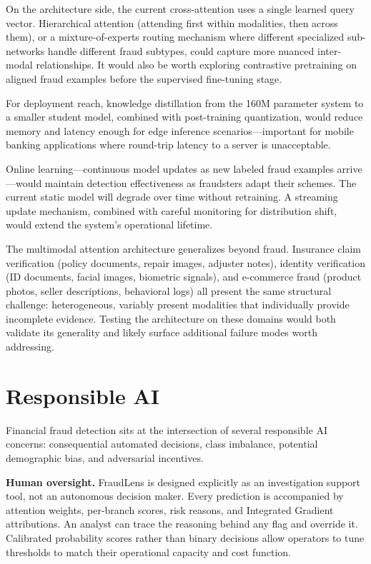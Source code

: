 \documentclass[10pt,conference,letterpaper]{IEEEtran}
\begin{document}
On the architecture side, the current cross-attention uses a single learned query vector.
Hierarchical attention (attending first within modalities, then across them), or a
mixture-of-experts routing mechanism where different specialized sub-networks handle
different fraud subtypes, could capture more nuanced inter-modal relationships. It would
also be worth exploring contrastive pretraining on aligned fraud examples before the
supervised fine-tuning stage.

For deployment reach, knowledge distillation from the 160M parameter system to a smaller
student model, combined with post-training quantization, would reduce memory and latency
enough for edge inference scenarios---important for mobile banking applications where
round-trip latency to a server is unacceptable.

Online learning---continuous model updates as new labeled fraud examples arrive---would
maintain detection effectiveness as fraudsters adapt their schemes. The current static
model will degrade over time without retraining. A streaming update mechanism, combined
with careful monitoring for distribution shift, would extend the system's operational
lifetime.

The multimodal attention architecture generalizes beyond fraud. Insurance claim
verification (policy documents, repair images, adjuster notes), identity verification
(ID documents, facial images, biometric signals), and e-commerce fraud (product photos,
seller descriptions, behavioral logs) all present the same structural challenge:
heterogeneous, variably present modalities that individually provide incomplete evidence.
Testing the architecture on these domains would both validate its generality and likely
surface additional failure modes worth addressing.

\section{Responsible AI}

Financial fraud detection sits at the intersection of several responsible AI concerns:
consequential automated decisions, class imbalance, potential demographic bias, and
adversarial incentives.

\textbf{Human oversight.} FraudLens is designed explicitly as an investigation support
tool, not an autonomous decision maker. Every prediction is accompanied by attention
weights, per-branch scores, risk reasons, and Integrated Gradient attributions. An
analyst can trace the reasoning behind any flag and override it. Calibrated probability
scores rather than binary decisions allow operators to tune thresholds to match their
operational capacity and cost function.
\end{document}
